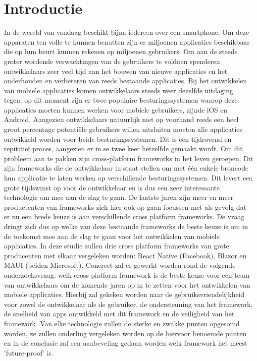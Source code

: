 
\section{Introductie} %
\label{sec:introductie}

In de wereld van vandaag beschikt bijna iedereen over een smartphone. Om deze apparaten ten volle te kunnen benutten zijn er miljoenen applicaties beschikbaar die op hun beurt kunnen rekenen op miljoenen gebruikers. Om aan de steeds groter wordende verwachtingen van de gebruikers te voldoen spenderen ontwikkelaars zeer veel tijd aan het bouwen van nieuwe applicaties en het onderhouden en verbeteren van reeds bestaande applicaties. Bij het ontwikkelen van mobiele applicaties komen ontwikkelaars steeds weer dezelfde uitdaging tegen: op dit moment zijn er twee populaire besturingssystemen waarop deze applicaties moeten kunnen werken voor mobiele gebruikers, zijnde iOS en Android. Aangezien ontwikkelaars natuurlijk niet op voorhand reeds een heel groot percentage potentiële gebruikers willen uitsluiten moeten alle applicaties ontwikkeld worden voor beide besturingssystemen. Dit is een tijdrovend en repititief proces, aangezien er in se twee keer hetzelfde gemaakt wordt. Om dit probleem aan te pakken zijn cross-platform frameworks in het leven geroepen. Dit zijn frameworks die de ontwikkelaar in staat stellen om met één enkele broncode hun applicatie te laten werken op verschillende besturingssystemen. Dit levert een grote tijdswinst op voor de ontwikkelaar en is dus een zeer interessante technologie om mee aan de slag te gaan. De laatste jaren zijn meer en meer productenten van frameworks zich hier ook op gaan focussen met als gevolg dat er nu een brede keuze is aan verschillende cross platform frameworks. De vraag dringt zich dus op welke van deze bestaande frameworks de beste keuze is om in de toekomst mee aan de slag te gaan voor het ontwikkelen van mobiele applicaties. In deze studie zullen drie cross platform frameworks van grote producenten met elkaar vergeleken worden: React Native (Facebook), Blazor en MAUI (beiden Microsoft). Concreet zal er gewerkt worden rond de volgende onderzoeksvraag: welk cross platform framework is de beste keuze voor een team van ontwikkelaars om de komende jaren op in te zetten voor het ontwikkelen van mobiele applicaties. Hierbij zal gekeken worden naar de gebruiksvriendelijkheid voor zowel de ontwikkelaar als de gebruiker, de ondersteuning van het framework, de snelheid van apps ontwikkeld met dit framework en de veiligheid van het framework. Van elke technologie zullen de sterke en zwakke punten opgesomd worden, ze zullen onderling vergeleken worden op de hiervoor benoemde punten en in de conclusie zal een aanbeveling gedaan worden welk framework het meest 'future-proof' is. 

